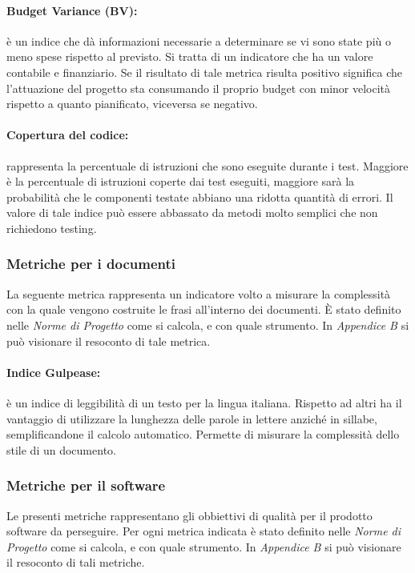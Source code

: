 \paragraph{Budget Variance (BV):} è un indice che dà informazioni necessarie a determinare se vi sono state più o meno spese rispetto al previsto. Si tratta di un indicatore che ha un valore contabile e finanziario. Se il risultato di tale metrica risulta positivo significa che l'attuazione del progetto sta consumando il proprio budget con minor velocità rispetto a quanto pianificato, viceversa se negativo.

\paragraph{Copertura del codice:} rappresenta la percentuale di istruzioni che sono eseguite durante i test. Maggiore è la percentuale di istruzioni coperte dai test eseguiti, maggiore sarà la probabilità
che le componenti testate abbiano una ridotta quantità di errori. Il valore di tale indice può essere abbassato da metodi molto semplici che non richiedono testing.

\subsubsection{Metriche per i documenti}
La seguente metrica rappresenta un indicatore volto a misurare la complessità con la quale vengono costruite le frasi all'interno dei documenti.
È stato definito nelle \emph{Norme di Progetto \VersioneNP{}} come si calcola, e con quale strumento. In \emph{Appendice B} si può visionare il resoconto di tale metrica.

\paragraph{Indice Gulpease:} è un indice di leggibilità di un testo per la lingua italiana.
Rispetto ad altri ha il vantaggio di utilizzare la lunghezza delle parole in lettere anziché in sillabe, semplificandone il calcolo automatico. Permette di misurare la complessità dello stile di un documento.

\subsubsection{Metriche per il software}
Le presenti metriche rappresentano gli obbiettivi di qualità per il prodotto software da perseguire.
Per ogni metrica indicata è stato definito nelle \emph{Norme di Progetto \VersioneNP{}} come si calcola, e con quale strumento. In \emph{Appendice B} si può visionare il resoconto di tali metriche.

